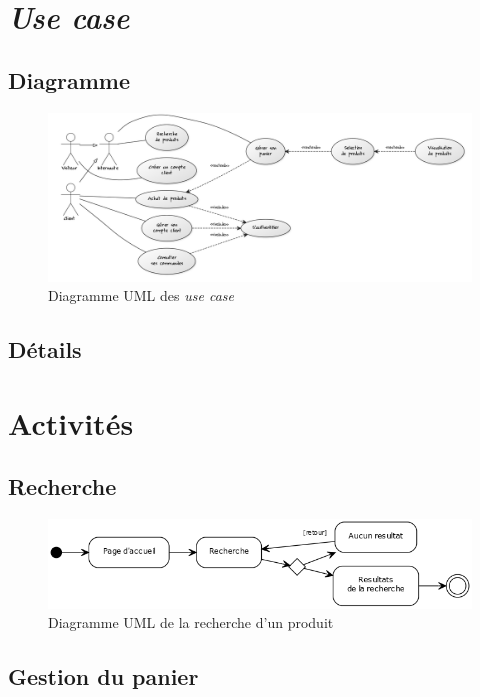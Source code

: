 \documentclass[12pt]{article}
\begin{document}
\section{\textit{Use case}}

\subsection{Diagramme}

\begin{figure}[ht]
    \center
    \includegraphics[scale=0.33]{../Diagrams/UseCaseDiagrams/usecase_global.png}
    \caption*{Diagramme UML des \textit{use case}}
\end{figure}

\subsection{Détails}

\section{Activités}

\subsection{Recherche}

\begin{figure}[ht]
    \center
    \includegraphics[scale=0.6]{../Diagrams/ActivityDiagrams/recherche.png}
    \caption*{Diagramme UML de la recherche d'un produit}
\end{figure}

\subsection{Gestion du panier}
\end{document}
